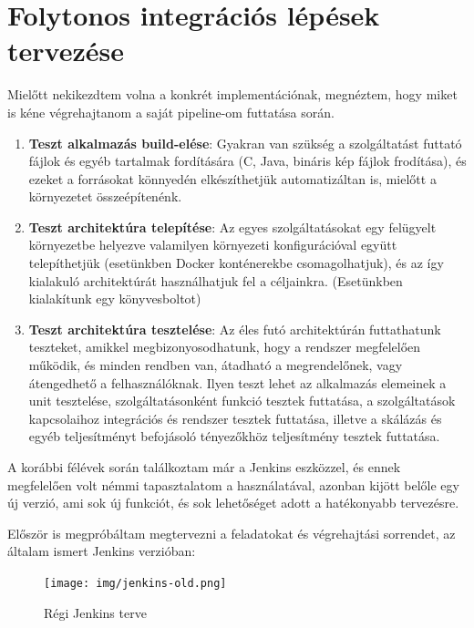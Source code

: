 \documentclass[11pt,magyar,a4paper,twoside,]{report}
\providecommand{\tightlist}{%
  \setlength{\itemsep}{0pt}\setlength{\parskip}{0pt}}
\begin{document}
\section{Folytonos integrációs lépések
tervezése}\label{folytonos-integruxe1ciuxf3s-luxe9puxe9sek-tervezuxe9se}

Mielőtt nekikezdtem volna a konkrét implementációnak, megnéztem, hogy
miket is kéne végrehajtanom a saját pipeline-om futtatása során.

\begin{enumerate}
\def\labelenumi{\arabic{enumi}.}
\tightlist
\item
  \textbf{Teszt alkalmazás build-elése}: Gyakran van szükség a
  szolgáltatást futtató fájlok és egyéb tartalmak fordítására (C, Java,
  bináris kép fájlok frodítása), és ezeket a forrásokat könnyedén
  elkészíthetjük automatizáltan is, mielőtt a környezetet
  összeépítenénk.
\item
  \textbf{Teszt architektúra telepítése}: Az egyes szolgáltatásokat egy
  felügyelt környezetbe helyezve valamilyen környezeti konfigurációval
  együtt telepíthetjük (esetünkben Docker konténerekbe csomagolhatjuk),
  és az így kialakuló architektúrát használhatjuk fel a céljainkra.
  (Esetünkben kialakítunk egy könyvesboltot)
\item
  \textbf{Teszt architektúra tesztelése}: Az éles futó architektúrán
  futtathatunk teszteket, amikkel megbizonyosodhatunk, hogy a rendszer
  megfelelően működik, és minden rendben van, átadható a megrendelőnek,
  vagy átengedhető a felhasználóknak. Ilyen teszt lehet az alkalmazás
  elemeinek a unit tesztelése, szolgáltatásonként funkció tesztek
  futtatása, a szolgáltatások kapcsolaihoz integrációs és rendszer
  tesztek futtatása, illetve a skálázás és egyéb teljesítményt
  befojásoló tényezőkhöz teljesítmény tesztek futtatása.
\end{enumerate}

A korábbi félévek során találkoztam már a Jenkins eszközzel, és ennek
megfelelően volt némmi tapasztalatom a használatával, azonban kijött
belőle egy új verzió, ami sok új funkciót, és sok lehetőséget adott a
hatékonyabb tervezésre.

Először is megpróbáltam megtervezni a feladatokat és végrehajtási
sorrendet, az általam ismert Jenkins verzióban:

\begin{figure}[H]
\centering
\texttt{[image: img/jenkins-old.png]}
\caption{Régi Jenkins terve}
\end{figure}
\end{document}
